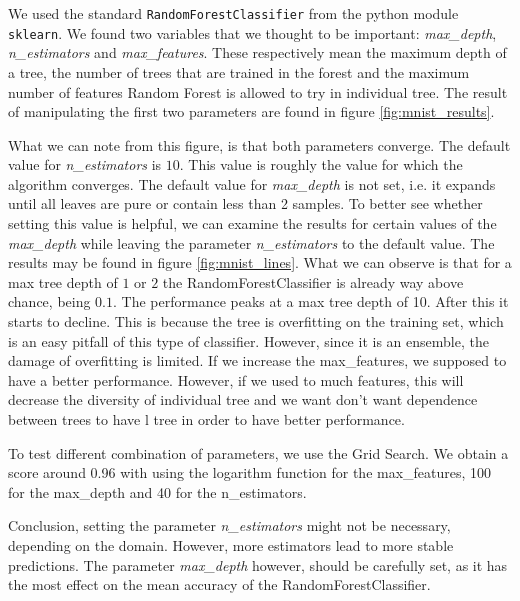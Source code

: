 \documentclass[11pt]{article}
\begin{document}
We used the standard \texttt{RandomForestClassifier} from the python module \texttt{sklearn}. We found two variables that we thought to be important: \textit{max\_depth}, \textit{n\_estimators} and \textit{max\_features}. These respectively mean the maximum depth of a tree, the number of trees that are trained in the forest and the maximum number of features Random Forest is allowed to try in individual tree. The result of manipulating the first two parameters are found in figure \ref{fig:mnist_results}.

What we can note from this figure, is that both parameters converge. The default value for \textit{n\_estimators} is $10$. This value is roughly the value for which the algorithm converges. The default value for \textit{max\_depth} is not set, i.e. it expands until all leaves are pure or contain less than 2 samples. To better see whether setting this value is helpful, we can examine the results for certain values of the \textit{max\_depth} while leaving the parameter \textit{n\_estimators} to the default value. The results may be found in figure \ref{fig:mnist_lines}. What we can observe is that for a max tree depth of $1$ or $2$ the RandomForestClassifier is already way above chance, being $0.1$. The performance peaks at a max tree depth of 10. After this it starts to decline. This is because the tree is overfitting on the training set, which is an easy pitfall of this type of classifier. However, since it is an ensemble, the damage of overfitting is limited.
If we increase the max\_features, we supposed to have a better performance. However, if we used to much features, this will decrease the diversity of individual tree and we want don't want dependence between trees to have l tree in order to have better performance. 

To test different combination of parameters, we use the Grid Search. We obtain a score around 0.96 with using the logarithm function for the max\_features, 100 for the max\_depth and 40 for the n\_estimators.

Conclusion, setting the parameter \textit{n\_estimators} might not be necessary, depending on the domain. However, more estimators lead to more stable predictions. The parameter \textit{max\_depth} however, should be carefully set, as it has the most effect on the mean accuracy of the RandomForestClassifier.
\end{document}
